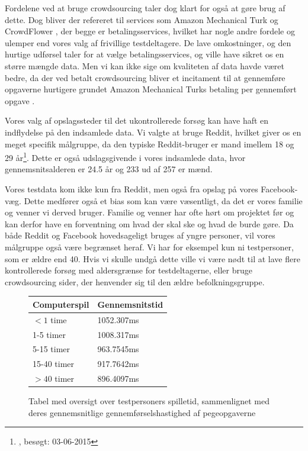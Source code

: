 Fordelene ved at bruge crowdsourcing taler dog klart for også at gøre brug af dette. Dog bliver der refereret til services som Amazon Mechanical Turk og CrowdFlower \cite{liu2012crowdsourcing}, der begge er betalingsservices, hvilket har nogle andre fordele og ulemper end vores valg af frivillige testdeltagere. De lave omkostninger, og den hurtige udførsel taler for at vælge betalingsservices, og ville have sikret os en større mængde data. Men vi kan ikke sige om kvaliteten af data havde været bedre, da der ved betalt crowdsourcing bliver et incitament til at gennemføre opgaverne hurtigere grundet Amazon Mechanical Turks betaling per gennemført opgave \cite{liu2012crowdsourcing}.

Vores valg af opslagssteder til det ukontrollerede forsøg kan have haft en indflydelse på den indsamlede data. Vi valgte at bruge Reddit, hvilket giver os en meget specifik målgruppe, da den typiske Reddit-bruger er mand imellem 18 og 29 år\footnote{\href{http://www.pewinternet.org/2013/07/03/6-of-online-adults-are-reddit-users/}, besøgt: 03-06-2015}. Dette er også udslagsgivende i vores indsamlede data, hvor gennemsnitsalderen er 24.5 år og 233 ud af 257 er mænd.

Vores testdata kom ikke kun fra Reddit, men også fra opslag på vores Facebook-væg. Dette medfører også et bias som kan være væsentligt, da det er vores familie og venner vi derved bruger. Familie og venner har ofte hørt om projektet før og kan derfor have en forventning om hvad der skal ske og hvad de burde gøre. Da både Reddit og Facebook hovedsageligt bruges af yngre personer, vil vores målgruppe også være begrænset heraf. Vi har for eksempel kun ni testpersoner, som er ældre end 40. Hvis vi skulle undgå dette ville vi være nødt til at lave flere kontrollerede forsøg med aldersgrænse for testdeltagerne, eller bruge crowdsourcing sider, der henvender sig til den ældre befolkningsgruppe.

\begin{figure}
	\centering
	\begin{tabular}{ll}
		\textbf{Computerspil} & \textbf{Gennemsnitstid}\\\hline
		$<1$ time    & 1052.307ms\\
		1-5 timer    & 1008.317ms\\
		5-15 timer   & 963.7545ms\\
		15-40 timer  & 917.7642ms\\
		$>40$ timer  & 896.4097ms\\
	\end{tabular}
	\caption{Tabel med oversigt over testpersoners spilletid, sammenlignet med deres gennemsnitlige gennemførselshastighed af pegeopgaverne}
	\label{tab:times_average}
\end{figure}

